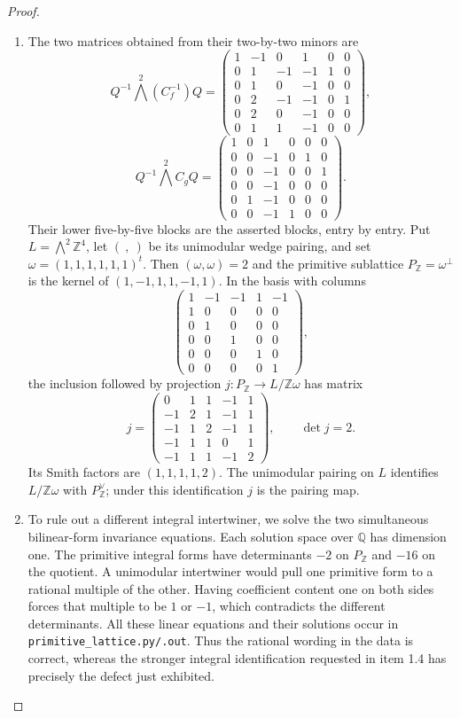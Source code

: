 \documentclass[11pt,a4paper]{article}
\theoremstyle{definition}
\begin{document}
\begin{proof}
\begin{enumerate}[label=\arabic*.]
\item The two matrices obtained from their two-by-two minors are
\[
Q^{-1}\bigwedge^2(C_f^{-1})Q=
\begin{pmatrix}
1&-1&0&1&0&0\\0&1&-1&-1&1&0\\0&1&0&-1&0&0\\
0&2&-1&-1&0&1\\0&2&0&-1&0&0\\0&1&1&-1&0&0
\end{pmatrix},
\]
\[
Q^{-1}\bigwedge^2C_gQ=
\begin{pmatrix}
1&0&1&0&0&0\\0&0&-1&0&1&0\\0&0&-1&0&0&1\\
0&0&-1&0&0&0\\0&1&-1&0&0&0\\0&0&-1&1&0&0
\end{pmatrix}.
\]
Their lower five-by-five blocks are the asserted blocks, entry by entry.
Put $L=\bigwedge^2\mathbb Z^4$, let $(\ ,\ )$ be its unimodular wedge
pairing, and set $\omega=(1,1,1,1,1,1)^t$.
Then $(\omega,\omega)=2$ and the primitive sublattice
$P_{\mathbb Z}=\omega^\perp$ is the kernel of
$(1,-1,1,1,-1,1)$.  In the basis with columns
\[
\begin{pmatrix}
1&-1&-1&1&-1\\1&0&0&0&0\\0&1&0&0&0\\
0&0&1&0&0\\0&0&0&1&0\\0&0&0&0&1
\end{pmatrix},
\]
the inclusion followed by projection
$j:P_{\mathbb Z}\longrightarrow L/\mathbb Z\omega$ has matrix
\[
j=\begin{pmatrix}
0&1&1&-1&1\\-1&2&1&-1&1\\-1&1&2&-1&1\\
-1&1&1&0&1\\-1&1&1&-1&2
\end{pmatrix},\qquad \det j=2.
\]
Its Smith factors are $(1,1,1,1,2)$.  The unimodular pairing on $L$
identifies $L/\mathbb Z\omega$ with $P_{\mathbb Z}^\vee$;
under this identification $j$ is the pairing map.

\item To rule out a different integral intertwiner, we solve the two
simultaneous bilinear-form invariance equations.  Each solution space
over $\mathbb Q$ has dimension one.  The primitive integral forms have
determinants $-2$ on $P_{\mathbb Z}$ and $-16$ on the quotient.
A unimodular intertwiner would pull one primitive form to a rational
multiple of the other.  Having coefficient content one on both sides
forces that multiple to be $1$ or $-1$, which contradicts the different
determinants.  All these linear equations and their solutions occur in
\texttt{primitive\_lattice.py/.out}.  Thus the rational wording in the
data is correct, whereas the stronger integral identification requested
in item 1.4 has precisely the defect just exhibited.


\end{enumerate}
\end{proof}
\end{document}
